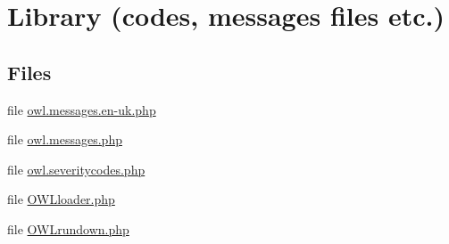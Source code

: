 \hypertarget{group__OWL__LIBRARY}{
\section{Library (codes, messages files etc.)}
\label{group__OWL__LIBRARY}
}
\subsection*{Files}
\begin{CompactItemize}
\item 
file \hyperlink{owl_8messages_8en-uk_8php}{owl.messages.en-uk.php}
\item 
file \hyperlink{owl_8messages_8php}{owl.messages.php}
\item 
file \hyperlink{owl_8severitycodes_8php}{owl.severitycodes.php}
\item 
file \hyperlink{OWLloader_8php}{OWLloader.php}
\item 
file \hyperlink{OWLrundown_8php}{OWLrundown.php}
\end{CompactItemize}

